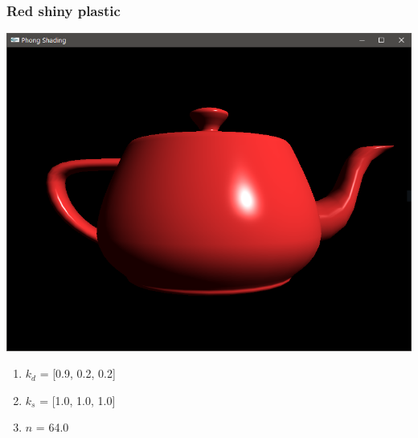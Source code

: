 \documentclass{beamer}
\begin{document}
\begin{frame}
    \frametitle{Red shiny plastic}

    \begin{center}
        \includegraphics[scale=0.2]{q5-red.png}
    \end{center}

    \begin{enumerate}
        \item $k_d$ = [0.9, 0.2, 0.2]
        \item $k_s$ = [1.0, 1.0, 1.0]
        \item $n$ = 64.0
    \end{enumerate}

\end{frame}
\end{document}
